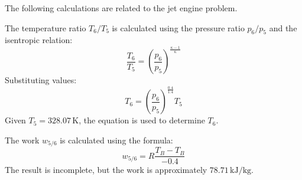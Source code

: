 The following calculations are related to the jet engine problem.  

The temperature ratio \( T_6 / T_5 \) is calculated using the pressure ratio \( p_6 / p_5 \) and the isentropic relation:  
\[
\frac{T_6}{T_5} = \left( \frac{p_6}{p_5} \right)^{\frac{\kappa - 1}{\kappa}}
\]  
Substituting values:  
\[
T_6 = \left( \frac{p_6}{p_5} \right)^{\frac{0.4}{1.4}} T_5
\]  
Given \( T_5 = 328.07 \, \text{K} \), the equation is used to determine \( T_6 \).  

The work \( w_{5/6} \) is calculated using the formula:  
\[
w_{5/6} = R \frac{T_B - T_B}{-0.4}
\]  
The result is incomplete, but the work is approximately \( 78.71 \, \text{kJ/kg} \).